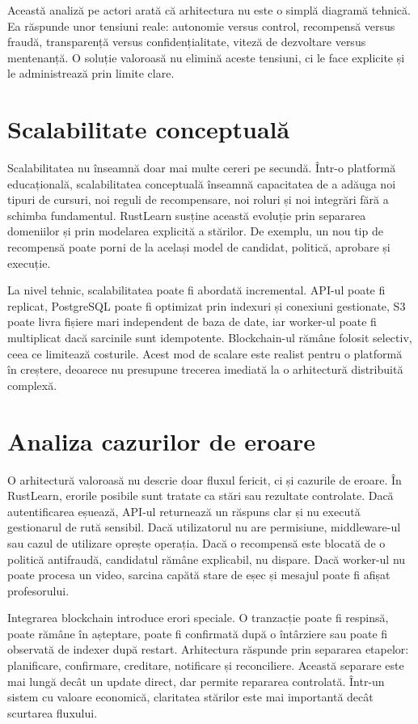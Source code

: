 Această analiză pe actori arată că arhitectura nu este o simplă diagramă tehnică. Ea răspunde unor tensiuni reale: autonomie versus control, recompensă versus fraudă, transparență versus confidențialitate, viteză de dezvoltare versus mentenanță. O soluție valoroasă nu elimină aceste tensiuni, ci le face explicite și le administrează prin limite clare.

\section{Scalabilitate conceptuală}
Scalabilitatea nu înseamnă doar mai multe cereri pe secundă. Într-o platformă educațională, scalabilitatea conceptuală înseamnă capacitatea de a adăuga noi tipuri de cursuri, noi reguli de recompensare, noi roluri și noi integrări fără a schimba fundamentul. RustLearn susține această evoluție prin separarea domeniilor și prin modelarea explicită a stărilor. De exemplu, un nou tip de recompensă poate porni de la același model de candidat, politică, aprobare și execuție.

La nivel tehnic, scalabilitatea poate fi abordată incremental. API-ul poate fi replicat, PostgreSQL poate fi optimizat prin indexuri și conexiuni gestionate, S3 poate livra fișiere mari independent de baza de date, iar worker-ul poate fi multiplicat dacă sarcinile sunt idempotente. Blockchain-ul rămâne folosit selectiv, ceea ce limitează costurile. Acest mod de scalare este realist pentru o platformă în creștere, deoarece nu presupune trecerea imediată la o arhitectură distribuită complexă.

\section{Analiza cazurilor de eroare}
O arhitectură valoroasă nu descrie doar fluxul fericit, ci și cazurile de eroare. În RustLearn, erorile posibile sunt tratate ca stări sau rezultate controlate. Dacă autentificarea eșuează, API-ul returnează un răspuns clar și nu execută gestionarul de rută sensibil. Dacă utilizatorul nu are permisiune, middleware-ul sau cazul de utilizare oprește operația. Dacă o recompensă este blocată de o politică antifraudă, candidatul rămâne explicabil, nu dispare. Dacă worker-ul nu poate procesa un video, sarcina capătă stare de eșec și mesajul poate fi afișat profesorului.

Integrarea blockchain introduce erori speciale. O tranzacție poate fi respinsă, poate rămâne în așteptare, poate fi confirmată după o întârziere sau poate fi observată de indexer după restart. Arhitectura răspunde prin separarea etapelor: planificare, confirmare, creditare, notificare și reconciliere. Această separare este mai lungă decât un update direct, dar permite repararea controlată. Într-un sistem cu valoare economică, claritatea stărilor este mai importantă decât scurtarea fluxului.

